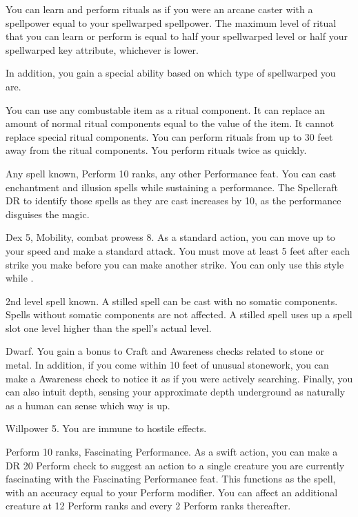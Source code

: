 \featben You can learn and perform rituals as if you were an arcane caster with a spellpower equal to your spellwarped spellpower.
The maximum level of ritual that you can learn or perform is equal to half your spellwarped level or half your spellwarped key attribute, whichever is lower.

In addition, you gain a special ability based on which type of spellwarped you are.

 \x
{}
You can use any combustable item as a ritual component.
It can replace an amount of normal ritual components equal to the value of the item.
It cannot replace special ritual components.
You can perform rituals from up to 30 feet away from the ritual components.
You perform rituals twice as quickly.

\featpres Any spell known, Perform 10 ranks, any other Performance feat.
\featben You can cast enchantment and illusion spells while sustaining a performance.
The Spellcraft DR to identify those spells as they are cast increases by 10, as the performance disguises the magic.

\featpres Dex 5, Mobility, combat prowess 8.
\featben As a standard action, you can move up to your speed and make a standard attack.
You must move at least 5 feet after each strike you make before you can make another strike.
You can only use this style while \unencumbered.

\featpre 2nd level spell known.
\featben A stilled spell can be cast with no somatic components.
Spells without somatic components are not affected.
A stilled spell uses up a spell slot one level higher than the spell's actual level.

\featpre Dwarf.
\featben You gain a  bonus to Craft and Awareness checks related to stone or metal.
In addition, if you come within 10 feet of unusual stonework, you can make a Awareness check to notice it as if you were actively searching.
Finally, you can also intuit depth, sensing your approximate depth underground as naturally as a human can sense which way is up.

\featpre Willpower 5.
\featben You are immune to hostile  effects.

\featpres Perform 10 ranks, Fascinating Performance.
\featben As a swift action, you can make a DR 20 Perform check to suggest an action to a single creature you are currently fascinating with the Fascinating Performance feat.
This functions as the  spell, with an accuracy equal to your Perform modifier.
You can affect an additional creature at 12 Perform ranks and every 2 Perform ranks thereafter.

